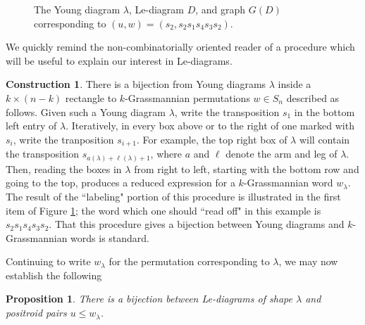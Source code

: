 \documentclass[11pt]{amsart}
\newtheorem{prop}[thm]{Proposition}
\theoremstyle{definition}
\newtheorem{con}[thm]{Construction}
\theoremstyle{remark}
\numberwithin{equation}{section}
\begin{document}
\begin{figure}
\begin{tikzpicture}
\end{tikzpicture}
  \caption{\label{Le depiction} The Young diagram $\lambda$, Le-diagram $D$, and graph $G(D)$ corresponding to $(u,w) = (s_2,s_2s_1s_4s_3s_2)$.}
\end{figure}

We quickly remind the non-combinatorially oriented reader of a procedure which will be useful to explain our interest in Le-diagrams.

\begin{con}\label{**}
    There is a bijection from Young diagrams $\lambda$ inside a $k \times (n-k)$ rectangle to $k$-Grassmannian permutations $w \in S_n$ described as follows. Given such a Young diagram $\lambda$, write the transposition $s_1$ in the bottom left entry of $\lambda$. Iteratively, in every box above or to the right of one marked with $s_i$, write the tranposition $s_{i+1}$. For example, the top right box of $\lambda$ will contain the transposition $s_{a(\lambda) + \ell(\lambda) +1}$, where $a$ and $\ell$ denote the arm and leg of $\lambda$. Then, reading the boxes in $\lambda$ from right to left, starting with the bottom row and going to the top, produces a reduced expression for a $k$-Grassmannian word $w_\lambda$.\\
    
    The result of the ``labeling" portion of this procedure is illustrated in the first item of Figure \ref{Le depiction}; the word which one should ``read off" in this example is $s_2s_1s_4s_3s_2$. That this procedure gives a bijection between Young diagrams and $k$-Grassmannian words is standard.
\end{con}

Continuing to write $w_\lambda$ for the permutation corresponding to $\lambda$, we may now establish the following

\begin{prop}
    There is a bijection between Le-diagrams of shape $\lambda$ and positroid pairs $u \leq w_\lambda$.
\end{prop}
\end{document}
